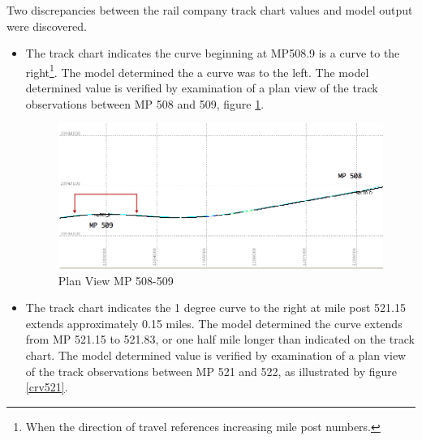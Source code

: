 Two discrepancies between the rail company track chart values and model output were discovered.
\begin{itemize}

\item The track chart indicates the curve beginning at MP508.9 is a curve to the right\footnote{When the direction of travel references increasing mile post numbers.}. The model determined the a curve was to the left. The model determined value is verified by examination of a plan view of the track observations between MP 508 and 509, figure \ref{crv508_9}.
\begin{figure}[!ht]
	\begin{center}
	\vspace{0pt}
	\includegraphics[scale=0.30]{graphics/508_9curve}
	\caption{Plan View MP 508-509}
	\label{crv508_9}
	\end{center}
	\vspace{-10pt}
\end{figure}

\item The track chart indicates the 1 degree curve to the right at mile post 521.15 extends approximately 0.15 miles. The model determined the curve extends from MP 521.15 to 521.83, or one half mile longer than indicated on the track chart. The model determined value is verified by examination of a plan view of the track observations between MP 521 and 522, as illustrated by figure \ref{crv521}.


\end{itemize}

